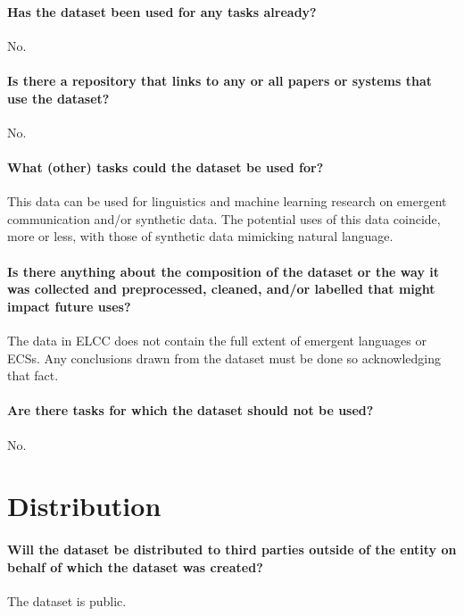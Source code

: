 \documentclass{article}
\begin{document}
\paragraph{Has the dataset been used for any tasks already?}
No.

\paragraph{Is there a repository that links to any or all papers or systems that use the dataset?}
No.

\paragraph{What (other) tasks could the dataset be used for?}
This data can be used for linguistics and machine learning research on emergent communication and/or synthetic data.
The potential uses of this data coincide, more or less, with those of synthetic data mimicking natural language.

\paragraph{Is there anything about the composition of the dataset or the way it was collected and preprocessed, cleaned, and/or labelled that might impact future uses?}
The data in ELCC does not contain the full extent of emergent languages or ECSs.
Any conclusions drawn from the dataset must be done so acknowledging that fact.


\paragraph{Are there tasks for which the dataset should not be used?}
No.


\section{Distribution}
\paragraph{Will the dataset be distributed to third parties outside of the entity on behalf of which the dataset was created?}
The dataset is public.
\end{document}
